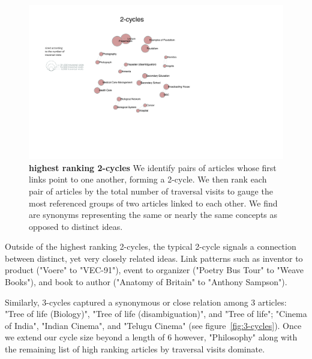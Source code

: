 \documentclass[pre,twocolumn,twoside,superscriptaddress,floatfix, aps, 10pt]{revtex4-1}
\begin{document}
\begin{figure}[tp!]
  \centering	
  \includegraphics[width=\textwidth]{graphics/2_cycles.pdf}
  \caption{
    \textbf{highest ranking 2-cycles}
    We identify pairs of articles whose first links point to one another, forming
    a 2-cycle. We then rank each pair of articles by the total number of 
    traversal visits to gauge the most referenced groups of two articles linked
    to each other. We find are synonyms representing the same or nearly the 
    same concepts as opposed to distinct ideas.
  }
  \label{fig:2-cycles}
\end{figure}

Outside of the highest ranking 2-cycles, the typical 2-cycle signals a connection between distinct, yet very closely related ideas. 
Link patterns such as inventor to product ("Voere" to "VEC-91"), event to organizer ("Poetry Bus Tour" to "Weave Books"), and book to author ("Anatomy of Britain" to "Anthony Sampson").

Similarly, 3-cycles captured a synonymous or close relation among 3 articles: "Tree of life (Biology)", "Tree of life (disambiguation)", 
and "Tree of life"; "Cinema of India", "Indian Cinema", and "Telugu Cinema"
(see figure~\ref{fig:3-cycles}).
Once we extend our cycle size beyond a length of 6 however, 
"Philosophy" along with the remaining list of high ranking articles by traversal visits dominate.
\end{document}
